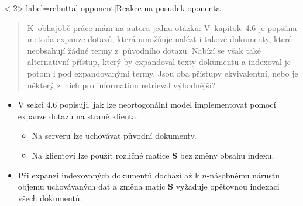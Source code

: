 \documentclass[aspectratio=169,t]{beamer}
\begin{document}

\begin{frame}<-2>[label=rebuttal-opponent]{Reakce na posudek oponenta}
\vspace*{-.1cm}
\begin{quote}
K~obhajobě práce mám na autora jednu otázku: V~kapitole 4.6 je popsána \alert<1>{metoda
expanze dotazů}, která umožňuje nalézt i takové dokumenty, které neobsahují
žádné termy z~původního dotazu. Nabízí se však také \alert<1>{alternativní přístup},
\alert<1>{který by expandoval texty dokumentu} a indexoval je potom i pod
expandovanými termy. \alert<1>{Jsou oba přístupy ekvivalentní}, nebo je některý
z~nich pro information retrieval výhodnější?
\end{quote}
\vspace*{-.1cm}
\begin{itemize}
  \item<2-> V sekci 4.6 popisuji, jak lze \alert<2-4>{neortogonální model
    implementovat pomocí expanze dotazu} na straně klienta.
  \begin{itemize}
    \item<3-> Na serveru lze uchovávat \alert<3>{původní dokumenty}.
    \item<4-> Na klientovi lze použít \alert<4>{rozličné matice $\mathbf S$}
      bez změny obsahu indexu.
  \end{itemize}
  \item<5-> Při expanzi indexovaných dokumentů \alert<5>{dochází až k
    $n$-násobnému nárůstu objemu uchovávaných dat} a \alert<5>{změna matic
    $\mathbf S$ vyžaduje opětovnou indexaci} všech dokumentů.
\end{itemize}
\end{frame}
\end{document}
